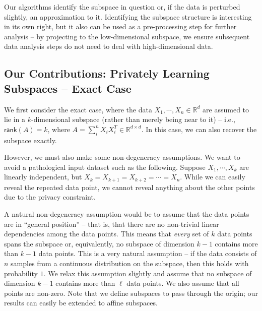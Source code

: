 Our algorithms identify the subspace in question or, if the data is perturbed slightly, an approximation to it. Identifying the subspace structure is interesting in its own right, but it also can be used as a pre-processing step for further analysis -- by projecting to the low-dimensional subspace, we ensure subsequent data analysis steps do not need to deal with high-dimensional data.

\subsection{Our Contributions: Privately Learning Subspaces -- Exact Case}

We first consider the exact case, where the data $X_1, \cdots, X_n \in \mathbb{R}^d$ are assumed to lie in a $k$-dimensional subspace (rather than merely being near to it) -- i.e., $\mathsf{rank}\left(A\right) = k$, where $A = \sum_i^n X_i X_i^T \in \mathbb{R}^{d \times d}$. In this case, we can also recover the subspace exactly.

However, we must also make some non-degeneracy assumptions. We want to avoid a pathological input dataset such as the following. Suppose $X_1, \cdots, X_k$ are linearly independent, but $X_k=X_{k+1}=X_{k+2}=\cdots=X_n$. While we can easily reveal the repeated data point, we cannot reveal anything about the other points due to the privacy constraint. 

A natural non-degeneracy assumption would be to assume that the data points are in ``general position'' -- that is, that there are no non-trivial linear dependencies among the data points. This means that \emph{every} set of $k$ data points spans the subspace or, equivalently, no subspace of dimension $k-1$ contains more than $k-1$ data points. This is a very natural assumption -- if the data consists of $n$ samples from a continuous distribution on the subspace, then this holds with probability $1$. We relax this assumption slightly and assume that no subspace of dimension $k-1$ contains more than $\ell$ data points. We also assume that all points are non-zero. Note that we define subspaces to pass through the origin; our results can easily be extended to affine subspaces.


